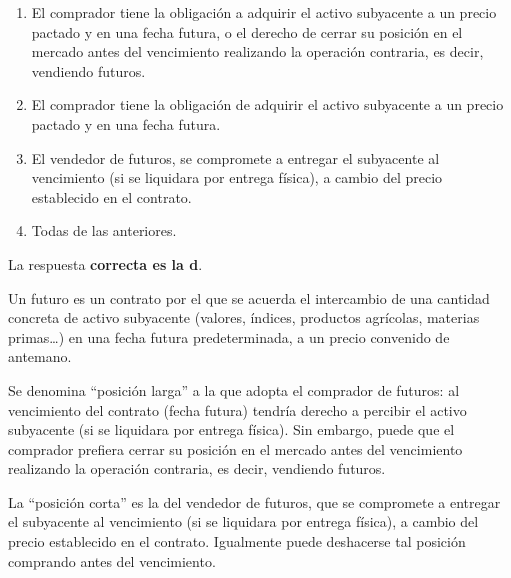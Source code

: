 \documentclass[
  letterpaper,
  DIV=11,
  numbers=noendperiod]{scrreprt}
\begin{document}
\begin{enumerate}
\def\labelenumi{\alph{enumi})}
\item
  El comprador tiene la obligación a adquirir el activo subyacente a un
  precio pactado y en una fecha futura, o el derecho de cerrar su
  posición en el mercado antes del vencimiento realizando la operación
  contraria, es decir, vendiendo futuros.
\item
  El comprador tiene la obligación de adquirir el activo subyacente a un
  precio pactado y en una fecha futura.
\item
  El vendedor de futuros, se compromete a entregar el subyacente al
  vencimiento (si se liquidara por entrega física), a cambio del precio
  establecido en el contrato.
\item
  Todas de las anteriores.
\end{enumerate}

\begin{tcolorbox}[enhanced jigsaw, left=2mm, opacityback=0, colback=white, breakable, arc=.35mm, bottomrule=.15mm, rightrule=.15mm, toprule=.15mm, leftrule=.75mm, colframe=quarto-callout-tip-color-frame]
\begin{minipage}[t]{5.5mm}
\textcolor{quarto-callout-tip-color}{\faLightbulb}
\end{minipage}%
\begin{minipage}[t]{\textwidth - 5.5mm}

La respuesta \textbf{correcta es la d}.

Un futuro es un contrato por el que se acuerda el intercambio de una
cantidad concreta de activo subyacente (valores, índices, productos
agrícolas, materias primas\ldots) en una fecha futura predeterminada, a
un precio convenido de antemano.

Se denomina ``posición larga'' a la que adopta el comprador de futuros:
al vencimiento del contrato (fecha futura) tendría derecho a percibir el
activo subyacente (si se liquidara por entrega física). Sin embargo,
puede que el comprador prefiera cerrar su posición en el mercado antes
del vencimiento realizando la operación contraria, es decir, vendiendo
futuros.

La ``posición corta'' es la del vendedor de futuros, que se compromete a
entregar el subyacente al vencimiento (si se liquidara por entrega
física), a cambio del precio establecido en el contrato. Igualmente
puede deshacerse tal posición comprando antes del vencimiento.

\end{minipage}%
\end{tcolorbox}
\end{document}
